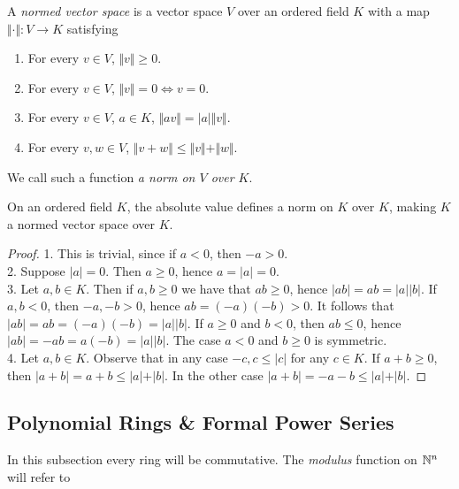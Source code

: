         \begin{definition}
            A \textit{normed vector space} is a vector space $V$ over an ordered field $K$ with a map $\Vert \cdot \Vert : V\rightarrow K$ satisfying 
            \begin{enumerate}
                \item For every $v\in V$, $\Vert v\Vert \geq 0$.
                \item For every $v\in V$, $\Vert v \Vert = 0\iff v = 0$.
                \item For every $v\in V$, $a\in K$, $\Vert av\Vert = \vert a\vert \Vert v\Vert$.
                \item For every $v,w\in V$, $\Vert v+ w\Vert \leq \Vert v\Vert +\Vert w\Vert.$
            \end{enumerate}
            We call such a function \textit{a norm on $V$ over $K$}.
        \end{definition}
        \begin{lemma}
            On an ordered field $K$, the absolute value defines a norm on $K$ over $K$, making $K$ a normed vector space over $K$.
        \end{lemma}
        \begin{proof}
            1. This is trivial, since if $a <0$, then $-a>0$.\\
            2. Suppose $\vert a \vert =0$. Then $a\geq 0$, hence $a=\vert a\vert =0$.\\
            3. Let $a,b\in K$. Then if $a,b\geq 0$ we have that $ab\geq 0$, hence $\vert ab\vert = ab=\vert a \vert \vert b\vert$. If $a,b <0$, then $-a,-b>0$, hence $ab=(-a)(-b)>0$. It follows that $\vert ab\vert=ab =(-a)(-b)=\vert a\vert \vert b\vert$. If $a\geq 0$ and $b<0$, then $ab\leq 0$, hence $\vert ab\vert = -ab=a(-b)=\vert a\vert \vert b\vert$. The case $a<0$ and $b\geq 0$ is symmetric.\\
            4. Let $a,b\in K$. Observe that in any case $-c,c\leq \vert c \vert $ for any $c\in K$. If $a+b\geq 0$, then $\vert a+b\vert = a+b\leq \vert a \vert +\vert b\vert$. In the other case $\vert a+b\vert = -a-b\leq \vert a \vert + \vert b\vert $.
        \end{proof}

\subsection{Polynomial Rings \& Formal Power Series}
In this subsection every ring will be commutative. The \emph{modulus} function on $\mathbb{N}^n$ will refer to 

